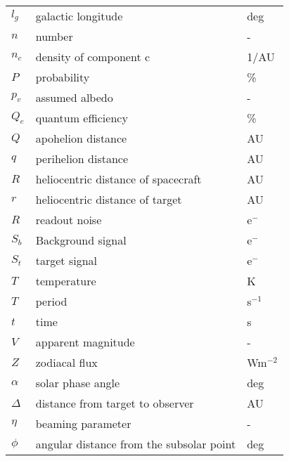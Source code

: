 \begin{table}[h!]
\begin{tabular}{l|l|l}
$l_g$              & galactic longitude                       & deg           \\
$n$               & number                                   & -             \\
$n_c$            & density of component c                   & 1/AU  \\
$P$               & probability                              & \%            \\
$p_v$              & assumed albedo                           & -             \\
$Q_e$              & quantum efficiency                       & \%            \\
$Q$              & apohelion distance                       & AU            \\
$q$              & perihelion distance                       & AU            \\
$R$               & heliocentric distance of spacecraft                   & AU            \\
$r$               & heliocentric distance of target          & AU            \\
$R$               & readout noise                            & e$^-$            \\
$S_b$              & Background signal                        & e$^-$            \\
$S_t$              & target signal                            & e$^-$            \\
$T$               & temperature                              & K             \\
$T$               & period                                   & s$^{-1}$           \\
$t$               & time                                     & s             \\
$V$               & apparent magnitude                       & -             \\
$Z$               & zodiacal flux                            & Wm$^{-2}$          \\
$\alpha$           & solar phase angle                        & deg           \\
$\Delta$           & distance from target to observer         & AU            \\
$\eta$             & beaming parameter                        & -             \\
$\phi$             & angular distance from the subsolar point & deg           \\

\end{tabular}
\end{table}
